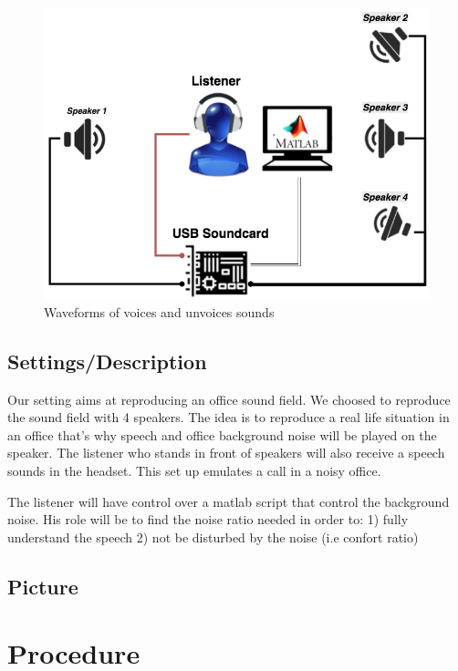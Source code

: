 \documentclass[12pt,a4paper]{article}
\begin{document}
\begin{figure}[H]
	\label{fig1}
	\centering
		\includegraphics[width=12cm]{setup}
		\caption{Waveforms of voices and unvoices sounds}
	\end{figure}


\subsection{Settings/Description}

Our setting aims at reproducing an office sound field. We choosed to reproduce the sound field with 4 speakers. 
The idea is to reproduce a real life situation in an office that's why speech and office background noise will be played on the speaker. 
The listener who stands in front of speakers will also receive a speech sounds in the headset. This set up emulates a call in a noisy office.

The listener will have control over a matlab script that control the background noise. His role will be to find the noise ratio needed in order to: 1) fully understand the speech 2) not be disturbed by the noise (i.e confort ratio)

\subsection{Picture}
\vspace{1cm}
\section{Procedure}
\end{document}
